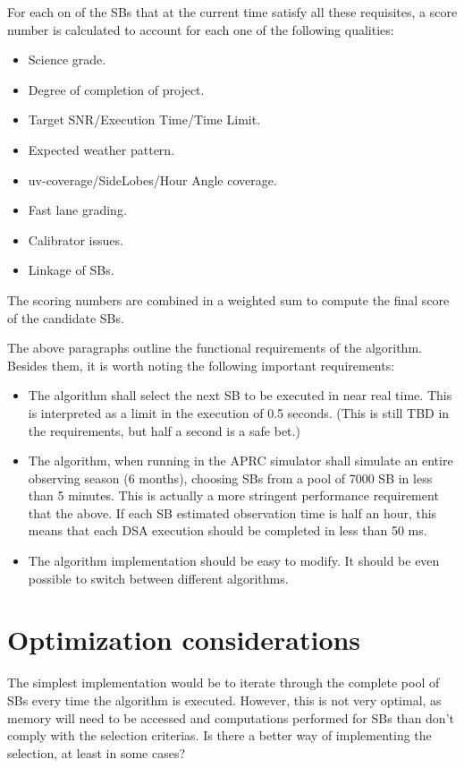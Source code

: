 \documentclass{article}
\begin{document}
For each on of the SBs that at the current time satisfy all these requisites, a
score number is calculated to account for each one of the following qualities: 
\begin{itemize}
\item Science grade.
\item Degree of completion of project.
\item Target SNR/Execution Time/Time Limit.
\item Expected weather pattern.
\item uv-coverage/SideLobes/Hour Angle coverage.
\item Fast lane grading.
\item Calibrator issues.
\item Linkage of SBs.
\end{itemize}
The scoring numbers are combined in a weighted sum to compute the final score of the
candidate SBs.

The above paragraphs outline the functional requirements of the algorithm. Besides them,
it is worth noting the following important requirements:
\begin{itemize}
\item The algorithm shall select the next SB to be executed in near real time. This is
interpreted as a limit in the execution of 0.5 seconds. (This is still TBD in the requirements,
but half a second is a safe bet.) 
\item The algorithm, when running in the APRC simulator shall simulate an entire observing
season (6 months), choosing SBs from a pool of 7000 SB in less than 5 minutes. This is actually
a more stringent performance requirement that the above. If each SB estimated observation time is
half an hour, this means that each DSA execution should be completed in less than 50 ms.
\item The algorithm implementation should be easy to modify. It should be even possible to
switch between different algorithms. 
\end{itemize}

\section{Optimization considerations}

The simplest implementation would be to iterate through the
complete pool of SBs every time the algorithm is executed. However, this is not
very optimal, as memory will need to be accessed and computations performed for
SBs than don't comply with the selection criterias.
Is there a better way of implementing the selection, at least in some cases?
\end{document}
